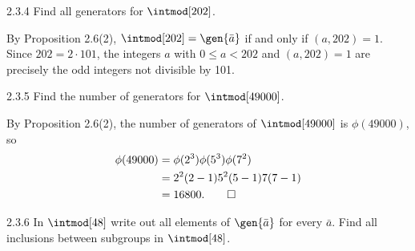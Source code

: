 \begin{exercise}{2.3.4}
    Find all generators for $\intmod[202]$.
\end{exercise}

\begin{sol}
    By Proposition 2.6(2), $\intmod[202] = \gen{\bar a}$ if and only if $(a, 202) = 1$.
    Since $202 = 2 \cdot 101$, the integers $a$ with $0 \leq a < 202$ and $(a, 202) = 1$ are precisely the odd integers not divisible by 101.
\end{sol}

\begin{exercise}{2.3.5}
    Find the number of generators for $\intmod[49000]$.
\end{exercise}

\begin{sol}
    By Proposition 2.6(2), the number of generators of $\intmod[49000]$ is $\phi(49000)$, so
    \begin{align*}
        \phi(49000) & = \phi(2^3)\phi(5^3)\phi(7^2) \\
        & = 2^2(2 - 1)5^2(5 - 1)7(7 - 1) \\
        & = 16800. \qedhere
    \end{align*}
\end{sol}

\begin{exercise}{2.3.6}
    In $\intmod[48]$ write out all elements of $\gen{\bar a}$ for every $\bar a$.
	Find all inclusions between subgroups in $\intmod[48]$.
\end{exercise}

